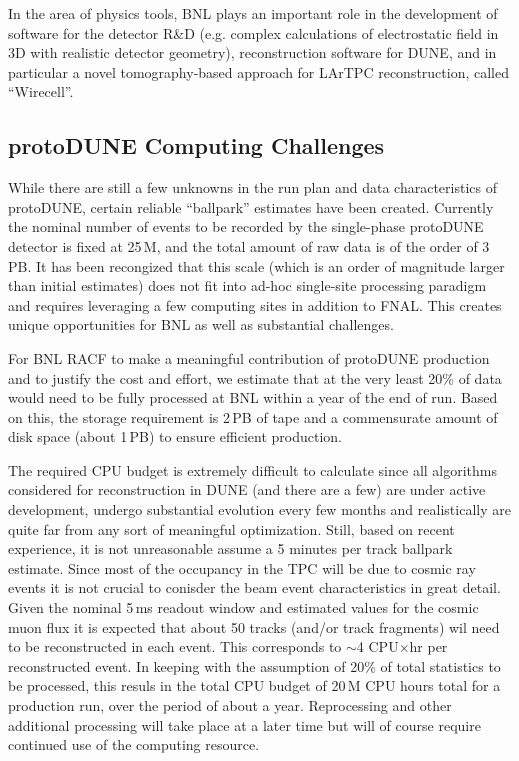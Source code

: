 \documentclass[pdftex,12pt,letter]{article}
\begin{document}
In the area of physics tools, BNL plays an important role in the development of software for the detector R\&D (e.g. complex
calculations of electrostatic field in 3D with realistic detector geometry), reconstruction software for DUNE, and
in particular a novel tomography-based approach for LArTPC reconstruction, called ``Wirecell''.


\subsection{protoDUNE Computing Challenges}
While there are still a few unknowns in the run plan and data characteristics of protoDUNE, certain
reliable ``ballpark'' estimates have been created. Currently the nominal number of events to be recorded by the single-phase
protoDUNE detector is fixed at 25\,M, and the total amount of raw data is of the order of 3\,PB. It has been recongized
that this scale (which is an order of magnitude larger than initial estimates) does not fit into ad-hoc single-site processing paradigm
and requires leveraging a few computing sites in addition to FNAL. This creates unique opportunities for BNL as well as substantial challenges.

For BNL RACF to make a meaningful contribution of protoDUNE production and to justify the cost and effort, we estimate that at
the very least 20\% of data would need to be fully processed at BNL within a year of the end of run. Based on this, the storage requirement is 2\,PB of tape and
a commensurate amount of disk space (about 1\,PB) to ensure efficient production.

The required CPU budget is extremely difficult to calculate since all algorithms considered for reconstruction in DUNE (and there are
a few) are under active development, undergo substantial evolution every few months and realistically are quite far from any
sort of meaningful optimization. Still, based on recent experience, it is not unreasonable assume a 5 minutes per track ballpark estimate.
Since most of the occupancy in the TPC will be due to cosmic ray events it is not crucial to conisder the beam event characteristics in
great detail. Given the nominal 5\,ms readout window and estimated values for the cosmic muon flux it is expected that about 50
tracks (and/or track fragments) wil need to be reconstructed in each event. This corresponds to $\sim$4 CPU$\times$hr per reconstructed
event. In keeping with the assumption of 20\% of total statistics to be processed, this resuls in the total CPU budget of 20\,M CPU
hours total for a production run, over the period of about a year. Reprocessing and other additional processing will take place
at a later time but will of course require continued use of the computing resource.
\end{document}
